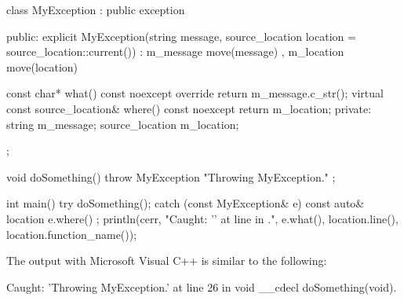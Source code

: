 \begin{cpp}
class MyException : public exception
{
    public:
        explicit MyException(string message,
            source_location location = source_location::current())
            : m_message { move(message) }
            , m_location { move(location) }
        { }

        const char* what() const noexcept override { return m_message.c_str(); }
        virtual const source_location& where() const noexcept{ return m_location; }
    private:
        string m_message;
        source_location m_location;
};

void doSomething()
{
    throw MyException { "Throwing MyException." };
}

int main()
{
    try {
        doSomething();
    } catch (const MyException& e) {
        const auto& location { e.where() };
        println(cerr, "Caught: '{}' at line {} in {}.",
            e.what(), location.line(), location.function_name());
    }
}
\end{cpp}

The output with Microsoft Visual C++ is similar to the following:

\begin{shell}
Caught: 'Throwing MyException.' at line 26 in void __cdecl doSomething(void).
\end{shell}


























